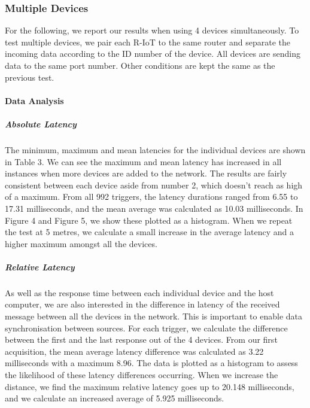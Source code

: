 

\subsubsection{Multiple Devices}

For the following, we report our results when using 4 devices simultaneously. To test multiple devices, we pair each R-IoT to the same router and separate the incoming data according to the ID number of the device. All devices are sending data to the same port number. Other conditions are kept the same as the previous test.

\paragraph{Data Analysis}

\subparagraph{Absolute Latency}
The minimum, maximum and mean latencies for the individual devices are shown in Table 3. We can see the maximum and mean latency has increased in all instances when more devices are added to the network. The results are fairly consistent between each device aside from number 2, which doesn’t reach as high of a maximum. From all 992 triggers, the latency durations ranged from 6.55 to 17.31 milliseconds, and the mean average was calculated as 10.03 milliseconds. In Figure 4 and Figure 5, we show these plotted as a histogram. When we repeat the test at 5 metres, we calculate a small increase in the average latency and a higher maximum amongst all the devices.





\subparagraph{Relative Latency}

As well as the response time between each individual device and the host computer, we are also interested in the difference in latency of the received message between all the devices in the network. This is important to enable data synchronisation between sources. For each trigger, we calculate the difference between the first and the last response out of the 4 devices. From our first acquisition, the mean average latency difference was calculated as 3.22 milliseconds with a maximum 8.96. The data is plotted as a histogram to assess the likelihood of these latency differences occurring. When we increase the distance, we find the maximum relative latency goes up to 20.148 milliseconds, and we calculate an increased average of 5.925 milliseconds.


